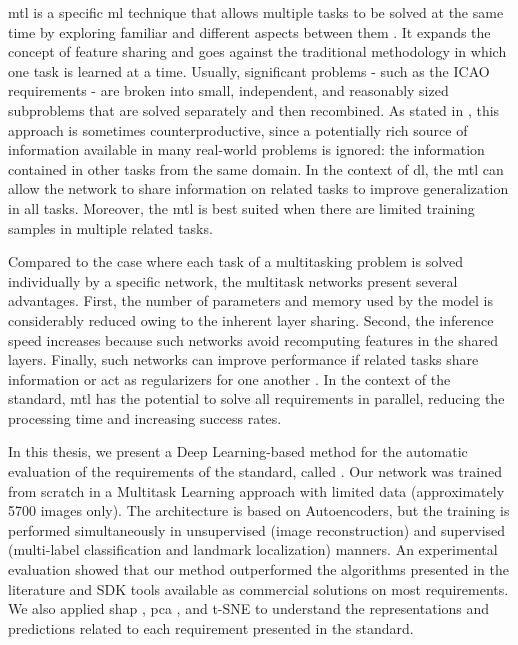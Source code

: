 \acl{mtl} is a specific \acl{ml} technique that allows multiple tasks to be solved at the same time by exploring familiar and different aspects between them \citep{zhang2017survey}. It expands the concept of feature sharing \citep{torralba2004sharing} and goes against the traditional methodology in which one task is learned at a time. Usually, significant problems - such as the ICAO requirements - are broken into small, independent, and reasonably sized subproblems that are solved separately and then recombined. As stated in \cite{Caruana1997}, this approach is sometimes counterproductive, since a potentially rich source of information available in many real-world problems is ignored: the information contained in other tasks from the same domain. In the context of \acl{dl}, the \acs{mtl} can allow the network to share information on related tasks to improve generalization in all tasks. Moreover, the \acl{mtl} is best suited when there are limited training samples in multiple related tasks.
 
Compared to the case where each task of a multitasking problem is solved individually by a specific network, the multitask networks present several advantages. First, the number of parameters and memory used by the model is considerably reduced owing to the inherent layer sharing. Second, the inference speed increases because such networks avoid recomputing features in the shared layers. Finally, such networks can improve performance if related tasks share information or act as regularizers for one another \citep{vandenhende2021multi}. In the context of the \icao standard, \acs{mtl} has the potential to solve all requirements in parallel, reducing the processing time and increasing success rates.
 
In this thesis, we present a Deep Learning-based method for the automatic evaluation of the requirements of the \icao standard, called \methodname. Our network was trained from scratch in a Multitask Learning approach with limited data (approximately 5700 images only). The architecture is based on Autoencoders, but the training is performed simultaneously in unsupervised (image reconstruction) and supervised (multi-label classification and landmark localization) manners. An experimental evaluation showed that our method outperformed the algorithms presented in the literature and SDK tools available as commercial solutions on most requirements. We also applied \acf{shap} \citep{shap2018}, \acf{pca} \citep{pca}, and t-SNE \citep{tsne} to understand the representations and predictions related to each requirement presented in the \icao standard.
 
